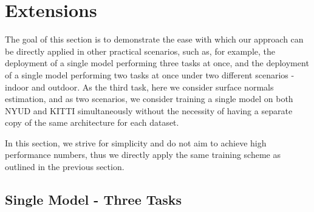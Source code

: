 \documentclass[letterpaper, 10 pt, conference]{ieeeconf}
\begin{document}
\section{Extensions}
\label{sec:extensions}

The goal of this section is to demonstrate the ease with which our approach can be directly applied in other practical scenarios, such as, for example, the deployment of a single model performing three tasks at once, and the deployment of a single model performing two tasks at once under two different scenarios - indoor and outdoor. As the third task, here we consider surface normals estimation, and as two scenarios, we consider training a single model on both NYUD and KITTI simultaneously without the necessity of having a separate copy of the same architecture for each dataset.

In this section, we strive for simplicity and do not aim to achieve high performance numbers, thus we directly apply the same training scheme as outlined in the previous section.

\subsection{Single Model - Three Tasks}
\label{subsec:ext1}
\end{document}
